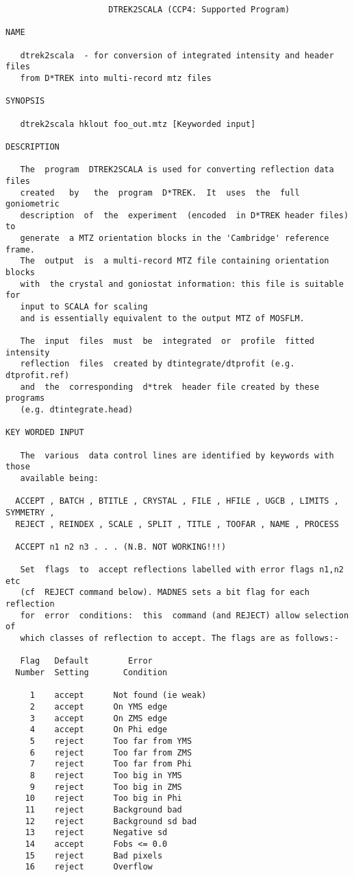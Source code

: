 \documentclass[a4paper, 11pt]{article}
\begin{document}
{
\small
\begin{verbatim}
                     DTREK2SCALA (CCP4: Supported Program)

NAME

   dtrek2scala  - for conversion of integrated intensity and header files
   from D*TREK into multi-record mtz files

SYNOPSIS

   dtrek2scala hklout foo_out.mtz [Keyworded input]

DESCRIPTION

   The  program  DTREK2SCALA is used for converting reflection data files
   created   by   the  program  D*TREK.  It  uses  the  full  goniometric
   description  of  the  experiment  (encoded  in D*TREK header files) to
   generate  a MTZ orientation blocks in the 'Cambridge' reference frame.
   The  output  is  a multi-record MTZ file containing orientation blocks
   with  the crystal and goniostat information: this file is suitable for
   input to SCALA for scaling
   and is essentially equivalent to the output MTZ of MOSFLM.

   The  input  files  must  be  integrated  or  profile  fitted intensity
   reflection  files  created by dtintegrate/dtprofit (e.g. dtprofit.ref)
   and  the  corresponding  d*trek  header file created by these programs
   (e.g. dtintegrate.head)

KEY WORDED INPUT

   The  various  data control lines are identified by keywords with those
   available being:

  ACCEPT , BATCH , BTITLE , CRYSTAL , FILE , HFILE , UGCB , LIMITS , SYMMETRY ,
  REJECT , REINDEX , SCALE , SPLIT , TITLE , TOOFAR , NAME , PROCESS

  ACCEPT n1 n2 n3 . . . (N.B. NOT WORKING!!!)

   Set  flags  to  accept reflections labelled with error flags n1,n2 etc
   (cf  REJECT command below). MADNES sets a bit flag for each reflection
   for  error  conditions:  this  command (and REJECT) allow selection of
   which classes of reflection to accept. The flags are as follows:-

   Flag   Default        Error
  Number  Setting       Condition

     1    accept      Not found (ie weak)
     2    accept      On YMS edge
     3    accept      On ZMS edge
     4    accept      On Phi edge
     5    reject      Too far from YMS
     6    reject      Too far from ZMS
     7    reject      Too far from Phi
     8    reject      Too big in YMS
     9    reject      Too big in ZMS
    10    reject      Too big in Phi
    11    reject      Background bad
    12    reject      Background sd bad
    13    reject      Negative sd
    14    accept      Fobs <= 0.0
    15    reject      Bad pixels
    16    reject      Overflow


\end{verbatim}}
\end{document}
